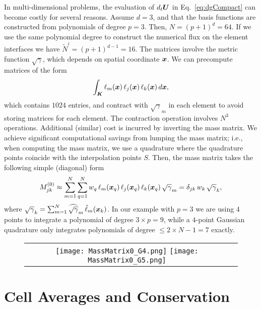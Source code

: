 \documentclass[10pt,preprint]{aastex}
\begin{document}
In multi-dimensional problems, the evaluation of $d_{t}\boldsymbol{U}$ in Eq.~\eqref{eq:dgCompact} can become costly for several reasons.  
Assume $d=3$, and that the basis functions are constructed from polynomials of degree $p=3$.  
Then, $N=(p+1)^{d}=64$.  
If we use the same polynomial degree to construct the numerical flux on the element interfaces we have $\tilde{N}^{i}=(p+1)^{d-1}=16$.  
The matrices involve the metric function $\sqrt{\gamma}$, which depends on spatial coordinate $\boldsymbol{x}$.  
We can precompute matrices of the form
\begin{equation}
  \int_{\boldsymbol{K}}\ell_{m}(\boldsymbol{x})\,\ell_{j}(\boldsymbol{x})\,\ell_{k}(\boldsymbol{x})\,d\boldsymbol{x},
\end{equation}
which contains $1024$ entries, and contract with $\sqrt{\gamma}_{m}$ in each element to avoid storing matrices for each element.  
The contraction operation involves $N^{3}$ operations.  
Additional (similar) cost is incurred by inverting the mass matrix.  
We achieve significant computational savings from lumping the mass matrix; i.e., when computing the mass matrix, we use a quadrature where the quadrature points coincide with the interpolation points $S$.  
Then, the mass matrix takes the following simple (diagonal) form
\begin{equation}
  M_{jk}^{(0)}
  \approx\sum_{m=1}^{N}\sum_{q=1}^{N}w_{q}\,\ell_{m}(\boldsymbol{x}_{q})\,\ell_{j}(\boldsymbol{x}_{q})\,\ell_{k}(\boldsymbol{x}_{q})\,\sqrt{\gamma}_{m}
  =\delta_{jk}\,w_{k}\,\sqrt{\gamma}_{k},
\end{equation}
where $\sqrt{\gamma}_{k}=\sum_{m=1}^{N}\widehat{\sqrt{\gamma}}_{m}\,\hat{\ell}_{m}(\boldsymbol{x}_{k})$.  
In our example with $p=3$ we are using $4$ points to integrate a polynomial of degree $3\times p=9$, while a $4$-point Gaussian quadrature only integrates polynomials of degree $\le 2\times N-1=7$ exactly.  

\begin{figure}[h]
  \begin{center}
    \begin{tabular}{cc}
     \texttt{[image: MassMatrix0\_G4.png]}
     \texttt{[image: MassMatrix0\_G5.png]}
    \end{tabular}
  \end{center}
  \caption{}
  \label{fig:MassMats}
\end{figure}

\section{Cell Averages and Conservation}
\end{document}
